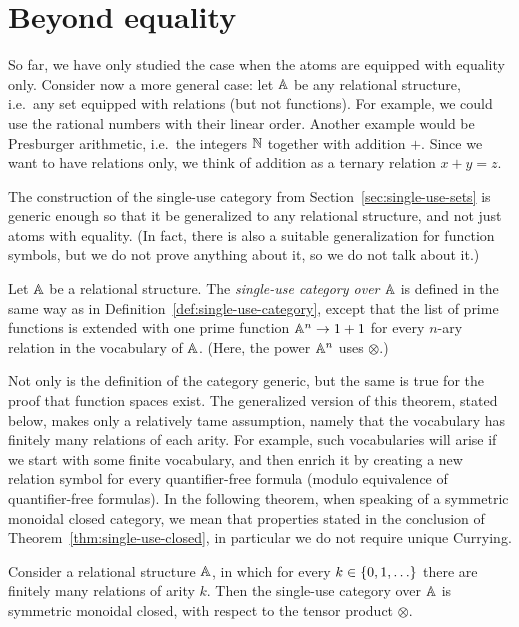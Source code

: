 \section{Beyond equality}
\label{sec:beyond-equality}

So far, we have only studied the case when the atoms are equipped with equality only. Consider now a more general case: let $\mathbb A$ be any relational structure, i.e.~any set equipped with relations (but not functions). For example, we could use the rational numbers with their linear order. Another example would be Presburger arithmetic, i.e.~the integers ${\mathbb N}$ together with addition $+$. Since we want to have relations only, we think of addition as a ternary relation $x + y =z$. 

The construction of the single-use category from Section~\ref{sec:single-use-sets} is generic enough so that it be generalized to any relational structure, and not just atoms with equality. (In fact, there is also a suitable generalization for function symbols, but we do not prove anything about it, so we do not talk about it.)

\begin{definition}\label{def:single-use-category-relational-structures}
    Let $\mathbb A$ be a relational structure. The \emph{single-use category over $\mathbb A$} is defined in the same way as in Definition~\ref{def:single-use-category}, except that the list of prime functions is extended with one prime function  $\mathbb A^n \to 1 + 1$ 
        for every $n$-ary relation in the vocabulary of $\mathbb A$. (Here, the power $\mathbb A^n$ uses $\otimes$.)
\end{definition}


Not only is the definition of the category generic, but the same is true for  the proof that function spaces exist. The generalized version of this theorem, stated below, makes only a relatively tame assumption, namely that the vocabulary has finitely many relations of each arity. For example, such vocabularies will arise if we start with some finite vocabulary, and then enrich it by creating a new relation symbol for every quantifier-free formula (modulo equivalence of quantifier-free formulas). In the following theorem, when speaking of a symmetric monoidal closed category, we mean that properties stated in the conclusion of Theorem~\ref{thm:single-use-closed}, in particular we do not require unique Currying.



\begin{theorem}\label{thm:single-use-closed-relational-structures}
    Consider a relational structure $\mathbb A$, in which for every $k \in \{0,1,\ldots\}$ there are finitely many relations of arity $k$. Then the single-use category over $\mathbb A$ is symmetric monoidal closed, with respect to the tensor product $\otimes$.
\end{theorem}


